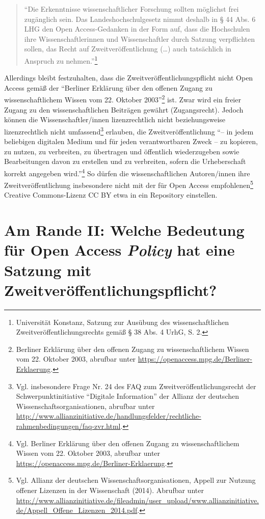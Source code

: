 \documentclass[a4paper,
fontsize=11pt,
oneside,
numbers=noperiodatend,
parskip=half-,
bibliography=totoc,
final
]{scrartcl}
\begin{document}
\begin{quote}
\enquote{Die Erkenntnisse wissenschaftlicher Forschung sollten möglichst
frei zugänglich sein. Das Landeshochschulgesetz nimmt deshalb in § 44
Abs. 6 LHG den Open Access-Gedanken in der Form auf, dass die
Hochschulen ihre Wissenschaftlerinnen und Wissenschaftler durch Satzung
verpflichten sollen, das Recht auf Zweitveröffentlichung (\ldots{}) auch
tatsächlich in Anspruch zu nehmen.}\footnote{Universität Konstanz,
  Satzung zur Ausübung des wissenschaftlichen
  Zweit\-ver\-öffent\-lich\-ungs\-rechts gemäß § 38 Abs. 4 UrhG, S. 2.}
\end{quote}

Allerdings bleibt festzuhalten, dass die Zweit\-ver\-öffent\-lich\-ungs\-pflicht
nicht Open Access gemäß der \enquote{Berliner Erklärung über den offenen
Zugang zu wissenschaftlichem Wissen vom 22. Oktober 2003}\footnote{Berliner
  Erklärung über den offenen Zugang zu wissenschaftlichem Wissen vom 22.
  Oktober 2003, abrufbar unter
  \url{https://openaccess.mpg.de/Berliner-Erklaerung}.} ist. Zwar wird
ein freier Zugang zu den wissenschaftlichen Beiträgen gewährt
(Zugangsrecht). Jedoch können die Wissenschaftler/innen lizenzrechtlich
nicht beziehungsweise lizenzrechtlich nicht umfassend\footnote{Vgl.
  insbesondere Frage Nr. 24 des FAQ zum Zweit\-ver\-öffent\-lich\-ungs\-recht der
  Schwerpunktinitiative \enquote{Digitale Information} der Allianz der
  deutschen Wissenschaftsorganisationen, abrufbar unter
  \url{http://www.allianzinitiative.de/handlungsfelder/rechtliche-rahmenbedingungen/faq-zvr.html}.}
erlauben, die Zweitveröffentlichung \enquote{-- in jedem beliebigen
digitalen Medium und für jeden verantwortbaren Zweck -- zu kopieren, zu
nutzen, zu verbreiten, zu übertragen und öffentlich wiederzugeben sowie
Bearbeitungen davon zu erstellen und zu verbreiten, sofern die
Urheberschaft korrekt angegeben wird.}\footnote{Vgl. Berliner Erklärung
  über den offenen Zugang zu wissenschaftlichem Wissen vom 22. Oktober
  2003, abrufbar unter
  \url{https://openaccess.mpg.de/Berliner-Erklaerung}.} So dürfen die
wissenschaftlichen Autoren/innen ihre Zweitveröffentlichung insbesondere
nicht mit der für Open Access empfohlenen\footnote{Vgl. Allianz der
  deutschen Wissenschaftsorganisationen, Appell zur Nutzung offener
  Lizenzen in der Wissenschaft (2014). Abrufbar unter
  \url{http://www.allianzinitiative.de/fileadmin/user_upload/www.allianzinitiative.de/Appell_Offene_Lizenzen_2014.pdf}.}
Creative Commons-Lizenz CC BY etwa in ein Repository einstellen.

\hypertarget{am-rande-ii-welche-bedeutung-fuxfcr-open-access-policy-hat-eine-satzung-mit-zweitveruxf6ffentlichungspflicht}{%
\section*{\texorpdfstring{Am Rande II: Welche Bedeutung für Open
Access \emph{Policy} hat eine Satzung mit
Zweit\-ver\-öffent\-lich\-ungs\-pflicht?}{Am Rande II: Welche Bedeutung für Open Access Policy hat eine Satzung mit Zweit\-ver\-öffent\-lich\-ungs\-pflicht?}}\label{am-rande-ii-welche-bedeutung-fuxfcr-open-access-policy-hat-eine-satzung-mit-zweitveruxf6ffentlichungspflicht}}
\end{document}
